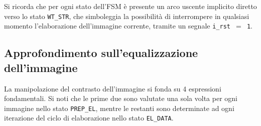 \documentclass{article}
\begin{document}
Si ricorda che per ogni stato dell'FSM è presente un arco uscente implicito diretto verso lo stato \texttt{WT\_STR}, che simboleggia la possibilità di interrompere in qualsiasi momento l'elaborazione dell'immagine corrente, tramite un segnale \texttt{i\_rst $=$ 1}.
\vspace{0,2cm}

\subsection{Approfondimento sull'equalizzazione dell'immagine} %
\label{sec:appr}
La manipolazione del contrasto dell’immagine si fonda su 4 espressioni fondamentali. Si noti che le prime due sono valutate una sola volta per ogni immagine nello stato \texttt{PREP\_EL}, mentre le restanti sono determinate ad ogni iterazione del ciclo di elaborazione nello stato \texttt{EL\_DATA}.
\end{document}
